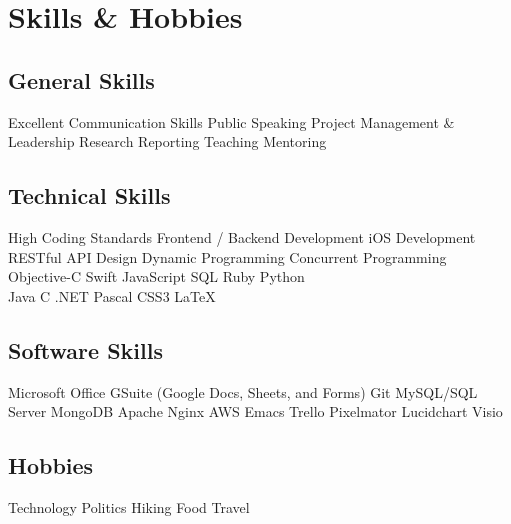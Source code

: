 \section{Skills \& Hobbies}
\small

\subsection{General Skills}
\chevron{} Excellent Communication Skills
\chevron{} Public Speaking
\chevron{} Project Management \& Leadership
\chevron{} Research
\chevron{} Reporting
\chevron{} Teaching
\chevron{} Mentoring
\medskip

\subsection{Technical Skills}
\chevron{} High Coding Standards
\chevron{} Frontend / Backend Development
\chevron{} iOS Development~
\chevron{} RESTful API Design
\chevron{} Dynamic Programming
\chevron{} Concurrent Programming
\chevron{} Objective-C
\chevron{} Swift
\chevron{} JavaScript
\chevron{} SQL
\chevron{} Ruby
\chevron{} Python
\chevron{} \Csh{}\\
\chevron{} Java
\chevron{} C
\chevron{} \Cpp{}
\chevron{} .NET
\chevron{} Pascal
\chevron{} CSS3
\chevron{} {\rmfamily\LaTeX}
\medskip

\subsection{Software Skills}
\chevron{} Microsoft Office
\chevron{} GSuite (Google Docs, Sheets, and Forms)
\chevron{} Git
\chevron{} MySQL/SQL Server
\chevron{} MongoDB
\chevron{} Apache
\chevron{} Nginx
\chevron{} AWS
\chevron{} Emacs
\chevron{} Trello
\chevron{} Pixelmator
\chevron{} Lucidchart
\chevron{} Visio
\medskip

\subsection{Hobbies}
\chevron{} Technology
\chevron{} Politics
\chevron{} Hiking
\chevron{} Food
\chevron{} Travel

